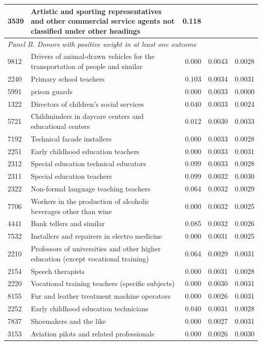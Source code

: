 \begin{longtable}{p{}>{\raggedright\arraybackslash}p{}rrr}
3539 & Artistic and sporting representatives and other commercial service agents not classified under other headings & 0.118 & & \\
\midrule
\multicolumn{5}{l}{\textit{Panel B. Donors with positive weight in at least one outcome}} \\
9812 & Drivers of animal-drawn vehicles for the transportation of people and similar & 0.000 & 0.0043 & 0.0028 \\
2240 & Primary school teachers & 0.103 & 0.0034 & 0.0031 \\
5991 & prison guards & 0.000 & 0.0033 & 0.0000 \\
1322 & Directors of children's social services & 0.040 & 0.0033 & 0.0024 \\
5721 & Childminders in daycare centers and educational centers & 0.012 & 0.0030 & 0.0033 \\
7192 & Technical facade installers & 0.000 & 0.0033 & 0.0028 \\
2251 & Early childhood education teachers & 0.000 & 0.0033 & 0.0031 \\
2312 & Special education technical educators & 0.099 & 0.0033 & 0.0028 \\
2311 & Special education teachers & 0.099 & 0.0032 & 0.0030 \\
2322 & Non-formal language teaching teachers & 0.064 & 0.0032 & 0.0029 \\
7706 & Workers in the production of alcoholic beverages other than wine & 0.000 & 0.0032 & 0.0025 \\
4441 & Bank tellers and similar & 0.085 & 0.0032 & 0.0026 \\
7532 & Installers and repairers in electro medicine & 0.000 & 0.0031 & 0.0025 \\
2210 & Professors of universities and other higher education (except vocational training) & 0.064 & 0.0029 & 0.0031 \\
2154 & Speech therapists & 0.000 & 0.0031 & 0.0028 \\
2220 & Vocational training teachers (specific subjects) & 0.000 & 0.0030 & 0.0031 \\
8155 & Fur and leather treatment machine operators & 0.000 & 0.0026 & 0.0031 \\
2252 & Early childhood education technicians & 0.040 & 0.0031 & 0.0028 \\
7837 & Shoemakers and the like & 0.000 & 0.0027 & 0.0031 \\
3153 & Aviation pilots and related professionals & 0.000 & 0.0026 & 0.0030 \\

\end{longtable}
